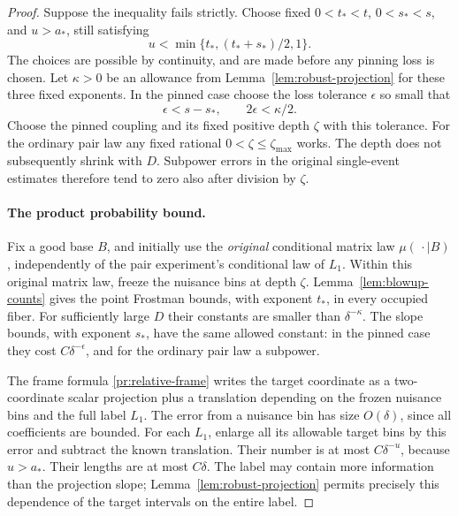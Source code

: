 \begin{proof}
Suppose the inequality fails strictly. Choose fixed
$0<t_*<t$, $0<s_*<s$, and $u>a_*$, still satisfying
\begin{equation}
 u<\min\{t_*,(t_*+s_*)/2,1\}.
\label{pr:strict-projection-margin}
\end{equation}
The choices are possible by continuity, and are made before any
pinning loss is chosen. Let $\kappa>0$ be an allowance from
Lemma~\ref{lem:robust-projection} for these three fixed exponents.
In the pinned case choose the loss tolerance $\epsilon$ so small
that
\begin{equation}
 \epsilon<s-s_*,\qquad 2\epsilon<\kappa/2.
\label{pr:loss-order}
\end{equation}
Choose the pinned coupling and its fixed positive depth $\zeta$
with this tolerance. For the ordinary pair law any fixed rational
$0<\zeta\le\zeta_{\max}$ works. The depth does not subsequently
shrink with $D$. Subpower errors in the original single-event
estimates therefore tend to zero also after division by $\zeta$.

\paragraph{The product probability bound.}
Fix a good base $B$, and initially use the \emph{original}
conditional matrix law $\mu(\,\cdot\mid B)$, independently of
the pair experiment's conditional law of $L_1$.
Within this original matrix law, freeze the nuisance bins at
depth $\zeta$. Lemma~\ref{lem:blowup-counts} gives the point
Frostman bounds, with exponent $t_*$, in every occupied fiber.
For sufficiently large $D$ their constants are smaller than
$\delta^{-\kappa}$. The slope bounds, with exponent $s_*$, have
the same allowed constant: in the pinned case they cost
$C\delta^{-\epsilon}$, and for the ordinary pair law a subpower.

The frame formula \eqref{pr:relative-frame} writes the target
coordinate as a two-coordinate scalar projection plus a
translation depending on the frozen nuisance bins and the full
label $L_1$. The error from a nuisance bin has size $O(\delta)$,
since all coefficients are bounded. For each $L_1$, enlarge all
its allowable target bins by this error and subtract the known
translation. Their number is at most $C\delta^{-u}$, because
$u>a_*$. Their lengths are at most $C\delta$.
The label may contain more information than the projection slope;
Lemma~\ref{lem:robust-projection} permits precisely this dependence
of the target intervals on the entire label.


\end{proof}
